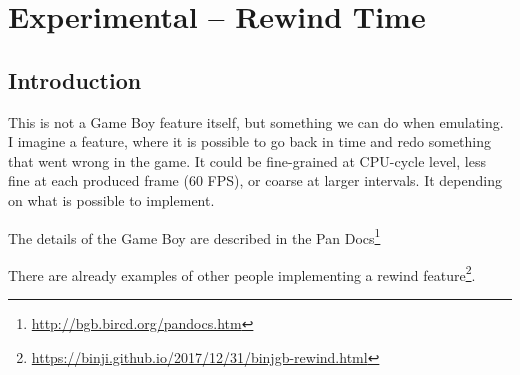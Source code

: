 \documentclass[11pt]{report} %
\begin{document}

\chapter*{Experimental -- Rewind Time}
\section*{Introduction}
This is not a Game Boy feature itself, but something we can do when emulating. I imagine a feature, where it is possible to go back in time and redo something that went wrong in the game. It could be fine-grained at CPU-cycle level, less fine at each produced frame (60 FPS), or coarse at larger intervals. It depending on what is possible to implement.

The details of the Game Boy are described in the Pan Docs\footnote{\url{http://bgb.bircd.org/pandocs.htm}}

There are already examples of other people implementing a rewind feature\footnote{\url{https://binji.github.io/2017/12/31/binjgb-rewind.html}}.
\end{document}
